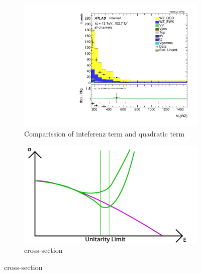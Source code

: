 \documentclass[../Bachelorarbeit.tex]{subfiles}
\begin{document}
\begin{figure}[h]
    \centering
    \begin{subfigure}{0.45\textwidth}
        \centering
        \includegraphics[width=\textwidth]{Plots/Sm_re/all_VV_MTWZ.pdf}
        \caption{Comparission of inteferenz term and quadratic term}
        \label{fig:dim8_quad_int_comparission}
    \end{subfigure}
    \begin{subfigure}{0.45\textwidth}
        \centering
        \includegraphics[width=\textwidth]{images/EFT_cross_section.png}
        \caption{cross-section}
        \label{fig:EFT_unitarity}
    \end{subfigure}
\end{figure}
\end{document}
